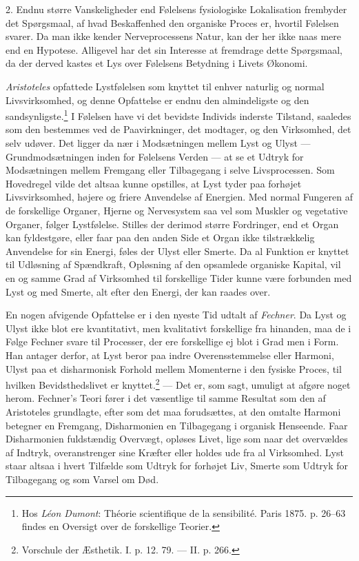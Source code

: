 \documentclass[12pt,a4paper,openany]{book}
\newcommand{\opage}[1]{\marginnote{\footnotesize\textit{[#1]}}}
\begin{document}
2. Endnu større Vanskeligheder end Følelsens fysiologiske Lokalisation
frembyder det Spørgsmaal, af hvad Beskaffenhed den organiske Proces er,
hvortil Følelsen svarer. Da man ikke kender Nerveprocessens Natur, kan
der her ikke naas mere end en Hypotese. Alligevel har det sin Interesse
at fremdrage dette Spørgsmaal, da der derved kastes et Lys over
Følelsens Betydning i Livets Økonomi.

\emph{Aristoteles} opfattede Lystfølelsen som knyttet til enhver
naturlig og normal Livsvirksomhed, og denne Opfattelse er endnu den
almindeligste og den sandsynligste.\footnote[1]{Hos \emph{Léon Dumont}:
Théorie scientifique de la sensibilité. Paris 1875. p. 26--63 findes en
Oversigt over de forskellige Teorier.} I Følelsen have vi det bevidste
Individs inderste Tilstand, saaledes som den bestemmes ved de
Paavirkninger, det modtager, og den Virksomhed, det selv udøver. Det
ligger da nær i Modsætningen mellem Lyst og Ulyst --- Grundmodsætningen
inden for Følelsens Verden --- at se et Udtryk for Modsætningen mellem
Fremgang eller Tilbagegang i selve Livsprocessen. Som Hovedregel vilde
det altsaa kunne opstilles, at Lyst tyder paa forhøjet Livsvirksomhed,
højere og friere Anvendelse af Energien. Med normal Fungeren af de
forskellige Organer, Hjerne og Nervesystem saa vel som Muskler og
vegetative Organer, følger Lystfølelse. Stilles der derimod større
Fordringer, end et Organ kan fyldestgøre, eller faar paa den anden Side
et Organ ikke tilstrækkelig Anvendelse for sin Energi, føles der Ulyst
eller Smerte. Da al Funktion er knyttet til Udløsning af Spændkraft,
Opløsning af den opsamlede organiske Kapital,
\opage{323}vil en og samme Grad af Virksomhed til forskellige Tider
kunne være forbunden med Lyst og med Smerte, alt efter den Energi, der
kan raades over.

En nogen afvigende Opfattelse er i den nyeste Tid udtalt af
\emph{Fechner}. Da Lyst og Ulyst ikke blot ere kvantitativt, men
kvalitativt forskellige fra hinanden, maa de i Følge Fechner svare til
Processer, der ere forskellige ej blot i Grad men i Form. Han antager
derfor, at Lyst beror paa indre Overensstemmelse eller Harmoni, Ulyst
paa et disharmonisk Forhold mellem Momenterne i den fysiske Proces, til
hvilken Bevidsthedslivet er knyttet.\footnote[1]{Vorschule der Æsthetik.
I. p. 12. 79. --- II. p. 266.} --- Det er, som sagt, umuligt at afgøre
noget herom. Fechner’s Teori fører i det væsentlige til samme Resultat
som den af Aristoteles grundlagte, efter som det maa forudsættes, at den
omtalte Harmoni betegner en Fremgang, Disharmonien en Tilbagegang i
organisk Henseende. Faar Disharmonien fuldstændig Overvægt, opløses
Livet, lige som naar det overvældes af Indtryk, overanstrenger sine
Kræfter eller holdes ude fra al Virksomhed. Lyst staar altsaa i hvert
Tilfælde som Udtryk for forhøjet Liv, Smerte som Udtryk for Tilbagegang
og som Varsel om Død.
\end{document}
